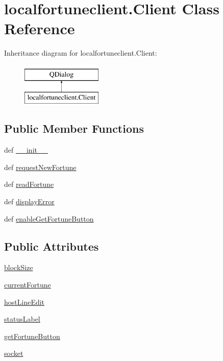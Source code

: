 \hypertarget{classlocalfortuneclient_1_1Client}{}\section{localfortuneclient.\+Client Class Reference}
\label{classlocalfortuneclient_1_1Client}
Inheritance diagram for localfortuneclient.\+Client\+:\begin{figure}[H]
\begin{center}
\leavevmode
\includegraphics[height=2.000000cm]{classlocalfortuneclient_1_1Client}
\end{center}
\end{figure}
\subsection*{Public Member Functions}
\begin{DoxyCompactItemize}
\item 
def \hyperlink{classlocalfortuneclient_1_1Client_aae0673024e7f23548bc49881001afc9a}{\+\_\+\+\_\+init\+\_\+\+\_\+}
\item 
def \hyperlink{classlocalfortuneclient_1_1Client_a64c570901f25d589203db5f187b06277}{request\+New\+Fortune}
\item 
def \hyperlink{classlocalfortuneclient_1_1Client_a3c7d685d6074bb46689cb137af2796c9}{read\+Fortune}
\item 
def \hyperlink{classlocalfortuneclient_1_1Client_a50f17db7ea6d2713bc59cdcf40d3c3d2}{display\+Error}
\item 
def \hyperlink{classlocalfortuneclient_1_1Client_ab2861dfcda1b17d5e71c9c4c109a0794}{enable\+Get\+Fortune\+Button}
\end{DoxyCompactItemize}
\subsection*{Public Attributes}
\begin{DoxyCompactItemize}
\item 
\hyperlink{classlocalfortuneclient_1_1Client_a888533e4ad94bdb2309707d6e17cb2da}{block\+Size}
\item 
\hyperlink{classlocalfortuneclient_1_1Client_aac6f58fa7aee2c35a93aa7c88989f666}{current\+Fortune}
\item 
\hyperlink{classlocalfortuneclient_1_1Client_ad476897f8d5a758aa86c0930d077c94c}{host\+Line\+Edit}
\item 
\hyperlink{classlocalfortuneclient_1_1Client_a9d3eaf1b95da533975f37a9d58410913}{status\+Label}
\item 
\hyperlink{classlocalfortuneclient_1_1Client_ae1f7eaa4945af4d9c5a9e57691cdd6b9}{get\+Fortune\+Button}
\item 
\hyperlink{classlocalfortuneclient_1_1Client_a723d9e8b70e35f23a712f17eb7988c6b}{socket}
\end{DoxyCompactItemize}


